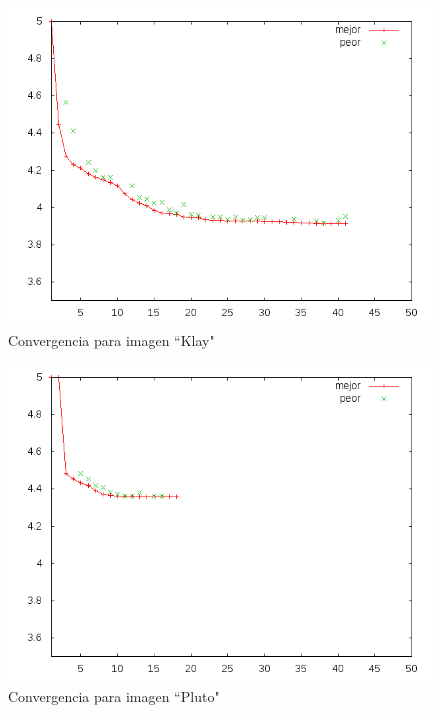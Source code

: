 \begin{figure}[b]
    \includegraphics[width=1.0\textwidth]{plot_klay}
    \caption{Convergencia para imagen ``Klay"}
    \label{img:plot-klay}
\end{figure}

\begin{figure}[b]
    \includegraphics[width=1.0\textwidth]{plot_pluto}
    \caption{Convergencia para imagen ``Pluto"}
    \label{img:plot-pluto}
\end{figure}

